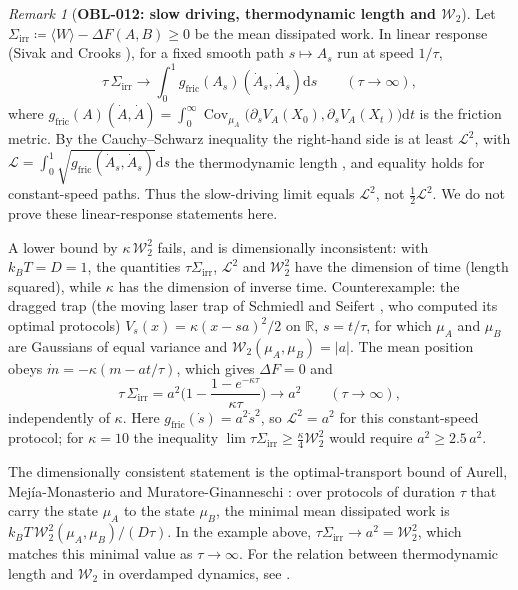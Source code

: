 \documentclass[11pt,a4paper,reqno]{amsart}
\theoremstyle{definition}
\theoremstyle{remark}
\newtheorem{remark}[theorem]{Remark}
\numberwithin{equation}{section}
\newcommand{\dif}{\mathrm{d}}
\begin{document}
\begin{remark}[\textbf{OBL-012: slow driving, thermodynamic length and $\mathcal{W}_2$}]
\label{rem:thermo_length_w2}
Let $\Sigma_{\mathrm{irr}} \coloneqq \langle W \rangle - \Delta F(A, B) \ge 0$ be the mean dissipated work. In linear response (Sivak and Crooks \cite{SivakCrooks2012}), for a fixed smooth path $s \mapsto A_s$ run at speed $1/\tau$,
\begin{equation}
\tau\,\Sigma_{\mathrm{irr}} \to \int_0^1 g_{\mathrm{fric}}(A_s)(\dot A_s, \dot A_s)\dif s \qquad (\tau\to\infty),
\end{equation}
where $g_{\mathrm{fric}}(A)(\dot A,\dot A) = \int_0^\infty \operatorname{Cov}_{\mu_A}\big(\partial_s V_{A}(X_0), \partial_s V_{A}(X_t)\big)\dif t$ is the friction metric. By the Cauchy--Schwarz inequality the right-hand side is at least $\mathcal{L}^2$, with $\mathcal{L} = \int_0^1 \sqrt{g_{\mathrm{fric}}(\dot A_s,\dot A_s)}\dif s$ the thermodynamic length \cite{SalamonBerry1983,Crooks2007}, and equality holds for constant-speed paths. Thus the slow-driving limit equals $\mathcal{L}^2$, not $\tfrac12\mathcal{L}^2$. We do not prove these linear-response statements here.

A lower bound by $\kappa\,\mathcal{W}_2^2$ fails, and is dimensionally inconsistent: with $k_BT = D = 1$, the quantities $\tau\Sigma_{\mathrm{irr}}$, $\mathcal{L}^2$ and $\mathcal{W}_2^2$ have the dimension of time (length squared), while $\kappa$ has the dimension of inverse time. Counterexample: the dragged trap (the moving laser trap of Schmiedl and Seifert \cite{SchmiedlSeifert2007}, who computed its optimal protocols) $V_s(x) = \kappa(x - sa)^2/2$ on $\mathbb{R}$, $s = t/\tau$, for which $\mu_A$ and $\mu_B$ are Gaussians of equal variance and $\mathcal{W}_2(\mu_A,\mu_B) = |a|$. The mean position obeys $\dot m = -\kappa(m - a t/\tau)$, which gives $\Delta F = 0$ and
\begin{equation}
\tau\,\Sigma_{\mathrm{irr}} = a^2\Big(1 - \frac{1 - e^{-\kappa\tau}}{\kappa\tau}\Big) \longrightarrow a^2 \qquad (\tau\to\infty),
\end{equation}
independently of $\kappa$. Here $g_{\mathrm{fric}}(\dot s) = a^2\dot s^2$, so $\mathcal{L}^2 = a^2$ for this constant-speed protocol; for $\kappa = 10$ the inequality $\lim\tau\Sigma_{\mathrm{irr}} \ge \frac{\kappa}{4}\mathcal{W}_2^2$ would require $a^2 \ge 2.5\,a^2$.

The dimensionally consistent statement is the optimal-transport bound of Aurell, Mej\'ia-Monasterio and Muratore-Ginanneschi \cite{Aurell2011}: over protocols of duration $\tau$ that carry the state $\mu_A$ to the state $\mu_B$, the minimal mean dissipated work is $k_BT\,\mathcal{W}_2^2(\mu_A,\mu_B)/(D\tau)$. In the example above, $\tau\Sigma_{\mathrm{irr}} \to a^2 = \mathcal{W}_2^2$, which matches this minimal value as $\tau \to \infty$. For the relation between thermodynamic length and $\mathcal{W}_2$ in overdamped dynamics, see \cite{NakazatoIto2021,VanVuSaito2023,ZhongDeWeese2024}.
\end{remark}
\end{document}
